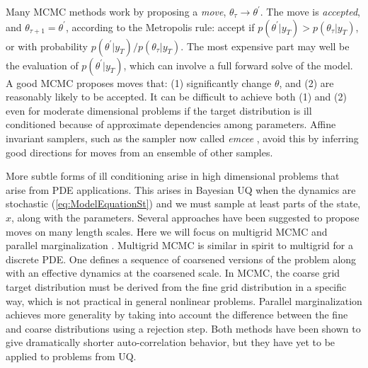 \documentclass[11pt]{article}
\newcommand{\MarginPar}[1]{\marginpar{%
\vskip-\baselineskip %
\raggedright\tiny\sffamily
\hrule\smallskip{\color{red}#1}\par\smallskip\hrule}}
\begin{document}
Many MCMC methods work by proposing a {\em move}, $\theta_{\tau} \to \theta^{\prime}$.
The move is {\em accepted}, and $\theta_{\tau+1} = \theta^{\prime}$, according to the Metropolis
rule: accept if $p(\theta^{\prime}|y_T) > p(\theta_{\tau}|y_T)$, or with probability
$p(\theta^{\prime}|y_T)/p(\theta_{\tau}|y_T)$.
The most expensive part may well be the evaluation of $p(\theta^{\prime}|y_T)$, which can involve
a full forward solve of the model.
A good MCMC proposes moves that: (1) significantly change $\theta$, and (2) are reasonably likely
to be accepted.
It can be difficult to achieve both (1) and (2) even for moderate dimensional problems if the 
target distribution is ill conditioned because of approximate dependencies among parameters.
Affine invariant samplers, such as the sampler now called {\em emcee} \cite{Foreman-Mackey}, 
avoid this by inferring good directions for moves from an ensemble of other samples.

More subtle forms of ill conditioning arise in high dimensional problems that arise
from PDE applications.
This arises in Bayesian UQ when the dynamics are stochastic (\ref{eq:ModelEquationSt}) and we
must sample at least parts of the state, $x$, along with the parameters.
Several approaches have been suggested to propose moves on many length scales.
Here we will focus on multigrid MCMC \cite{Goodman1989}
and parallel marginalization \cite{Weare2007}.
Multigrid MCMC is similar in spirit to multigrid for a discrete PDE.  
One defines a sequence of coarsened versions of the problem along with an effective
dynamics at the coarsened scale.
In MCMC, the coarse grid target distribution must be derived from the fine grid distribution
in a specific way, which is not practical in general nonlinear problems.  
Parallel marginalization achieves more generality by taking into account the difference between
the fine and coarse distributions using a rejection step. 
Both methods have been shown to give dramatically shorter auto-correlation behavior, but they have
yet to be applied to problems from UQ.
\end{document}
